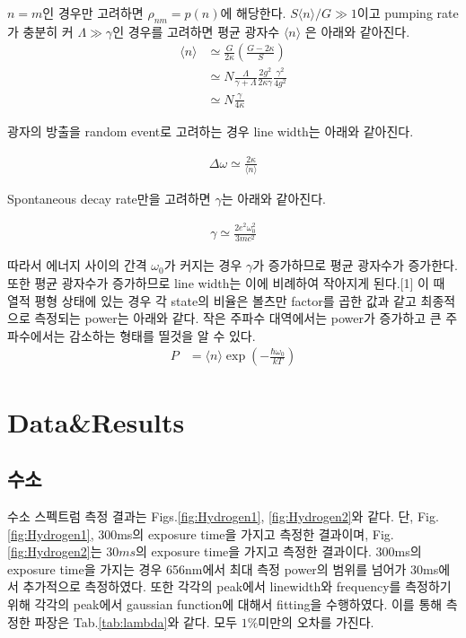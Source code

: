 \documentclass[%
 reprint,
 amsmath,amssymb,
 aps,
]{revtex4-2}
\begin{document}
$n=m$인 경우만 고려하면 $\rho_{nm} = p(n)$에 해당한다. $S\langle n \rangle / G \gg 1$이고 pumping rate가 충분히 커 $\Lambda \gg \gamma $인 경우를 고려하면 평균 광자수 $\langle n \rangle$ 은 아래와 같아진다.
\begin{align}
	\langle n \rangle &\simeq \frac{G}{2\kappa}\left( \frac{G-2\kappa}{S} \right)\\
	&\simeq N\frac{\Lambda}{\gamma + \Lambda} \frac{2g^{2}}{2\kappa\gamma} \frac{\gamma^{2}}{4g^{2}}\\
	& \simeq N\frac{\gamma}{4\kappa}
\end{align}

광자의 방출을 random event로 고려하는 경우 line width는 아래와 같아진다.

\begin{align}
	\Delta \omega \simeq \frac{2\kappa}{\langle n \rangle}\label{eq:final_linewidth}
\end{align}

Spontaneous decay rate만을 고려하면 $\gamma$는 아래와 같아진다.

\begin{align}
	\gamma \simeq \frac{2e^{2}\omega_{0}^{2}}{3mc^{2}}
\end{align}

따라서 에너지 사이의 간격 $\omega_{0}$가 커지는 경우 $\gamma$가 증가하므로 평균 광자수가 증가한다. 또한 평균 광자수가 증가하므로 line width는 이에 비례하여 작아지게 된다.[1] 이 때 열적 평형 상태에 있는 경우 각 state의 비율은 볼츠만 factor를 곱한 값과 같고 최종적으로 측정되는 power는 아래와 같다. 작은 주파수 대역에서는 power가 증가하고 큰 주파수에서는 감소하는 형태를 띨것을 알 수 있다. 
\begin{align}
	P &= \langle n \rangle\exp\left(-\frac{\hbar\omega_{0}}{kT}\right)\label{eq:finalpower}
\end{align}


\section{\label{sec:level1}Data\&Results}
\subsection{\label{sec:level2}수소}
수소 스펙트럼 측정 결과는 Figs.\ref{fig:Hydrogen1}, \ref{fig:Hydrogen2}와 같다. 단, Fig.\ref{fig:Hydrogen1}, 300ms의 exposure time을 가지고 측정한 결과이며, Fig.\ref{fig:Hydrogen2}는 $30ms$의 exposure time을 가지고 측정한 결과이다. 300ms의 exposure time을 가지는 경우 656nm에서 최대 측정 power의 범위를 넘어가 30ms에서 추가적으로 측정하였다. 또한 각각의 peak에서 linewidth와 frequency를 측정하기 위해 각각의 peak에서 gaussian function에 대해서 fitting을 수행하였다. 이를 통해 측정한 파장은 Tab.\ref{tab:lambda}와 같다. 모두 $1\%$미만의 오차를 가진다. 
\end{document}
